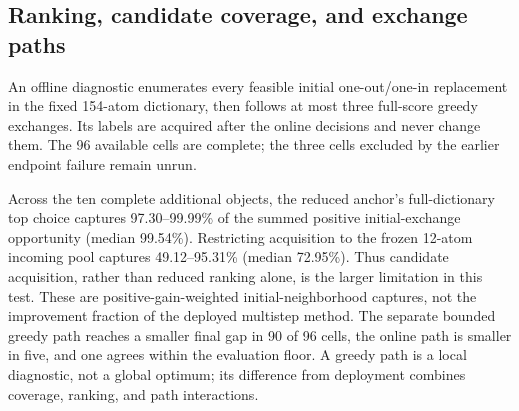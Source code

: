 \subsection{Ranking, candidate coverage, and exchange paths}
An offline diagnostic enumerates every feasible initial one-out/one-in replacement in the fixed 154-atom dictionary, then follows at most three full-score greedy exchanges. Its labels are acquired after the online decisions and never change them. The 96 available cells are complete; the three cells excluded by the earlier endpoint failure remain unrun.

Across the ten complete additional objects, the reduced anchor's full-dictionary top choice captures 97.30--99.99\% of the summed positive initial-exchange opportunity (median 99.54\%). Restricting acquisition to the frozen 12-atom incoming pool captures 49.12--95.31\% (median 72.95\%). Thus candidate acquisition, rather than reduced ranking alone, is the larger limitation in this test. These are positive-gain-weighted initial-neighborhood captures, not the improvement fraction of the deployed multistep method. The separate bounded greedy path reaches a smaller final gap in 90 of 96 cells, the online path is smaller in five, and one agrees within the evaluation floor. A greedy path is a local diagnostic, not a global optimum; its difference from deployment combines coverage, ranking, and path interactions.
